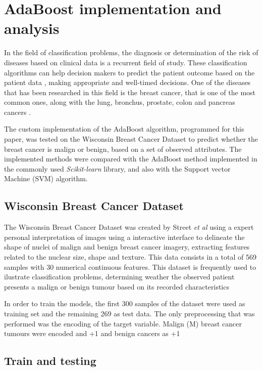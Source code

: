 \documentclass[11pt,twocolumn,letterpaper]{article}
\begin{document}
\section{AdaBoost implementation and analysis}

In the field of classification problems, the diagnosis or determination of the risk of diseases based on clinical data is a recurrent field of study. These classification algorithms can help decision makers to predict the patient outcome based on the patient data \cite{Bellazzi2008}, making appropriate and well-timed decisions. One of the diseases that has been researched in this field is the breast cancer, that is one of the most common ones, along with the lung, bronchus, prostate, colon and pancreas cancers \cite{afarap2018}. 

The custom implementation of the AdaBoost algorithm, programmed for this paper, was tested on the Wisconsin Breast Cancer Dataset to predict whether the breast cancer is malign or benign, based on a set of observed attributes. The implemented methods were compared with the AdaBoost method implemented in the commonly used \textit{Scikit-learn} library, and also with the Support vector Machine (SVM) algorithm. 

\subsection{Wisconsin Breast Cancer Dataset}

The Wisconsin Breast Cancer Dataset was created by Street \textit{et al} \cite{Street1993} using a expert personal interpretation of images using a interactive interface to delineate the shape of nuclei of malign and benign breast cancer imagery, extracting features related to the nuclear size, shape and texture. This data consists in a total of 569 samples with 30 numerical continuous features. This dataset is frequently used to ilustrate classification problems, determining weather the observed patient presents a malign or benign tumour based on its recorded characteristics \cite{afarap2018}

In order to train the models, the first 300 samples of the dataset were used as training set and the remaining 269 as test data. The only preprocessing that was performed was the encoding of the target variable. Malign (M) breast cancer tumours were encoded and +1 and benign cancers as +1

\subsection{Train and testing}
\end{document}

